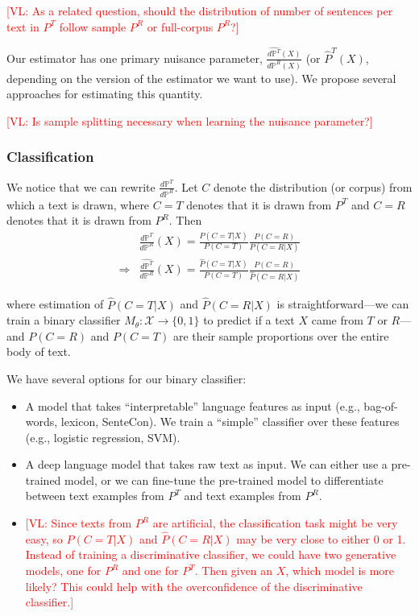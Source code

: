 \documentclass{article}
\newcommand{\vl}[1]{\textcolor{red}{[VL: #1]}}
\begin{document}
	\vl{As a related question, should the distribution of number of sentences per text in $P^T$ follow sample $P^R$ or full-corpus $P^R$?}
	
	Our estimator has one primary nuisance parameter, $\frac{\hat{d\mathbb{P}^T}(X)}{d\mathbb{P}^R(X)}$ (or $\hat{P}^T(X)$, depending on the version of the estimator we want to use). We propose several approaches for estimating this quantity.
	
	\vl{Is sample splitting necessary when learning the nuisance parameter?}
	
	\subsubsection{Classification}
	\label{sec:classification}
	
	We notice that we can rewrite $\frac{d\mathbb{P}^T}{d\mathbb{P}^R}$. Let $C$ denote the distribution (or corpus) from which a text is drawn, where $C=T$ denotes that it is drawn from $P^T$ and $C=R$ denotes that it is drawn from $P^R$. Then
	\begin{equation*}
		\begin{split}
			&\frac{d\mathbb{P}^T}{d\mathbb{P}^R}(X) = \frac{P(C=T|X)}{P(C=T)}\frac{P(C=R)}{P(C=R|X)}\\
			\Rightarrow &\frac{\hat{d\mathbb{P}^T}}{d\mathbb{P}^R}(X) = \frac{\hat{P}(C=T|X)}{P(C=T)}\frac{P(C=R)}{\hat{P}(C=R|X)}
		\end{split}
	\end{equation*}
	
	where estimation of $\hat{P}(C=T|X)$ and $\hat{P}(C=R|X)$ is straightforward---we can train a binary classifier $M_\theta: \mathcal{X} \rightarrow \{0,1\}$ to predict if a text $X$ came from $T$ or $R$---and $P(C=R)$ and $P(C=T)$ are their sample proportions over the entire body of text.
	
	We have several options for our binary classifier:
	\begin{itemize}
		\item A model that takes ``interpretable'' language features as input (e.g., bag-of-words, lexicon, SenteCon). We train a ``simple'' classifier over these features (e.g., logistic regression, SVM).
		\item A deep language model that takes raw text as input. We can either use a pre-trained model, or we can fine-tune the pre-trained model to differentiate between text examples from $P^T$ and text examples from $P^R$.
		\item \vl{Since texts from $P^R$ are artificial, the classification task might be very easy, so $\hat{P}(C=T|X)$ and $\hat{P}(C=R|X)$ may be very close to either 0 or 1. Instead of training a discriminative classifier, we could have two generative models, one for $P^R$ and one for $P^T$. Then given an $X$, which model is more likely? This could help with the overconfidence of the discriminative classifier.}
	\end{itemize}
	
\end{document}
